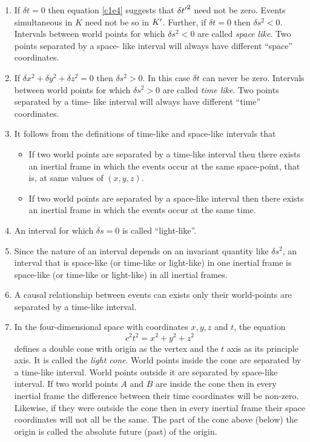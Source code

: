 \begin{enumerate}
\item If $\delta t = 0$ then equation \eqref{c1e4} suggests that $\delta {t^\prime}^2$
need not be zero. Events simultaneous in $K$ need not be so in $K^\prime$. Further, if
$\delta t = 0$ then $\delta s^2 < 0$. Intervals between world points for which 
$\delta s^2 < 0$ are called \emph{space like}. Two points separated by a space-
like interval will always have different ``space'' coordinates.

\item If $\delta x^2 + \delta y^2 + \delta z^2 = 0$ then $\delta s^2 > 0$. In this
case $\delta t$ can never be zero. Intervals between world points for which 
$\delta s^2 > 0$ are called \emph{time like}. Two points separated by a time-
like interval will always have different ``time'' coordinates.

\item It follows from the definitions of time-like and space-like intervals that
\begin{itemize}
\item If two world points are separated by a time-like interval then there exists
an inertial frame in which the events occur at the same space-point, that is, at
same values of $(x, y, z)$.
\item If two world points are separated by a space-like interval then there exists
an inertial frame in which the events occur at the same time.
\end{itemize}

\item An interval for which $\delta s = 0$ is called ``light-like''.

\item Since the nature of an interval depends on an invariant quantity like
$\delta s^2$, an interval that is space-like (or time-like or light-like) in one
inertial frame is space-like (or time-like or light-like) in all inertial frames.

\item A causal relationship between events can exists only their world-points
are separated by a time-like interval.

\item In the four-dimensional space with coordinates $x, y, z$ and $t$, the equation
\begin{equation}\label{c1e6}
c^2t^2 = x^2 + y^2 + z^2
\end{equation}
defines a double cone with origin as the vertex and the $t$ axis as its principle
axis. It is called the \emph{light cone}. 
World points inside the cone are separated by a time-like interval. World
points outside it are separated by space-like interval. If two world points $A$
and $B$ are inside the cone then in every inertial frame the difference between
their time coordinates will be non-zero. Likewise, if they were outside the cone
then in every inertial frame their space coordinates will not all be the same.
The part of the cone above (below) the origin is called the absolute future 
(past) of the origin.


\end{enumerate}
